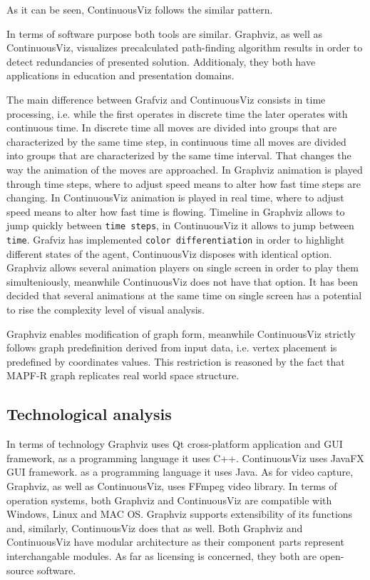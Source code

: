 \documentclass[thesis=B,english]{FITthesis}[2019/12/23]
\begin{document}
As it can be seen, ContinuousViz follows the similar pattern.

In terms of software purpose both tools are similar. Graphviz, as well as ContinuousViz, visualizes precalculated path-finding algorithm results in order to detect redundancies of presented solution. Additionaly, they both have applications in education and presentation domains.

The main difference between Grafviz and ContinuousViz consists in time processing, i.e. while the first operates in discrete time the later operates with continuous time. In discrete time all moves are divided into groups that are characterized by the same time step, in continuous time all moves are divided into groups that are characterized by the same time interval. That changes the way the animation of the moves are approached. In Graphviz animation is played through time steps, where to adjust speed means to alter how fast time steps are changing. In ContinuousViz animation is played in real time, where to adjust speed means to alter how fast time is flowing. Timeline in Graphviz allows to jump quickly between \verb|time steps|, in ContinuousViz it allows to jump between \verb|time|. Grafviz has implemented \verb|color differentiation| in order to highlight different states of the agent, ContinuousViz disposes with identical option. Graphviz allows several animation players on single screen in order to play them simulteniously, meanwhile ContinuousViz does not have that option. It has been decided that several animations at the same time on single screen has a potential to rise the complexity level of visual analysis. 

Graphviz enables modification of graph form, meanwhile ContinuousViz strictly follows graph predefinition derived from input data, i.e. vertex placement is predefined by coordinates values. This restriction is reasoned by the fact that MAPF-R graph replicates real world space structure.


\subsection{Technological analysis}

In terms of technology Graphviz uses Qt cross-platform application and GUI framework, as a programming language it uses C++. ContinuousViz uses JavaFX GUI framework. as a programming language it uses Java. As for video capture, Graphviz, as well as ContinuousViz, uses FFmpeg video library. In terms of operation systems, both Graphviz and ContinuousViz are compatible with Windows, Linux and MAC OS. Graphviz supports extensibility of its functions and, similarly, ContinuousViz does that as well. Both Graphviz and ContinuousViz have modular architecture as their component parts represent interchangable modules. As far as licensing is concerned, they both are open-source software.
\end{document}
